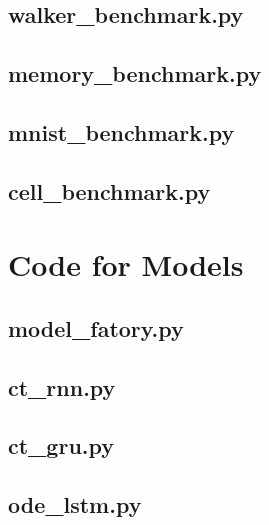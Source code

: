 \documentclass[draft,final]{vutinfth} %
\begin{document}
    \subsection{walker\_benchmark.py}
    
    \subsection{memory\_benchmark.py}
    
    \subsection{mnist\_benchmark.py}
    
    \subsection{cell\_benchmark.py}
    
    
    \section{Code for Models}
    \subsection{model\_fatory.py}
    
    \subsection{ct\_rnn.py}
    
    \subsection{ct\_gru.py}
    
    \subsection{ode\_lstm.py}
    
\end{document}
